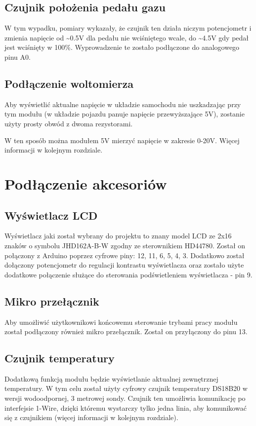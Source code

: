 \subsection{Czujnik położenia pedału gazu}
W tym wypadku, pomiary wykazały, że czujnik ten działa niczym potencjometr i zmienia napięcie od \textasciitilde0.5V dla pedału nie wciśniętego wcale, do \textasciitilde4.5V gdy pedał jest wciśnięty w 100\%. Wyprowadzenie te zostało podłączone do analogowego pinu A0.

\subsection{Podłączenie woltomierza}

Aby wyświetlić aktualne napięcie w układzie samochodu nie uszkadzając przy tym modułu (w układzie pojazdu panuje napięcie przewyższające 5V), zostanie użyty prosty obwód z dwoma rezystorami.


W ten sposób można modułem 5V mierzyć napięcie w zakresie 0-20V. Więcej informacji w kolejnym rozdziale.

\section{Podłączenie akcesoriów}

\subsection{Wyświetlacz LCD}
Wyświetlacz jaki został wybrany do projektu to znany model LCD ze 2x16 znaków o symbolu JHD162A-B-W zgodny ze sterownikiem HD44780. Został on połączony z Arduino poprzez cyfrowe piny: 12, 11, 6, 5, 4, 3. Dodatkowo został dołączony potencjometr do regulacji kontrastu wyświetlacza oraz zostało użyte dodatkowe połączenie służące do sterowania podświetleniem wyświetlacza - pin 9.


\subsection{Mikro przełącznik}
Aby umożliwić użytkownikowi końcowemu sterowanie trybami pracy modułu został podłączony również mikro przełącznik. Został on przyłączony do pinu 13.

\subsection{Czujnik temperatury}
Dodatkową funkcją modułu będzie wyświetlanie aktualnej zewnętrznej temperatury. W tym celu został użyty cyfrowy czujnik temperatury DS18B20 w wersji wodoodpornej, 3 metrowej sondy. Czujnik ten umożliwia komunikację po interfejsie 1-Wire, dzięki któremu wystarczy tylko jedna linia, aby komunikować się z czujnikiem (więcej informacji w kolejnym rozdziale).

